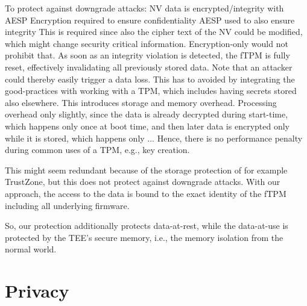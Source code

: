 To protect against downgrade attacks:
NV data is encrypted/integrity with AESP
Encryption required to ensure confidentiality
AESP used to also ensure integrity
This is required since also the cipher text of the NV could be modified, which might change security critical information.
Encryption-only would not prohibit that.
As soon as an integrity violation is detected, the \ac{fTPM} is fully reset, effectively invalidating all previously stored data.
Note that an attacker could thereby easily trigger a data loss.
This has to avoided by integrating the good-practices with working with a \ac{TPM}, which includes having secrets stored also elsewhere. %
This introduces storage and memory overhead.
Processing overhead only slightly, since the data is already decrypted during start-time, which happens only once at boot time, and then later data is encrypted only while it is stored, which happens only ... %
Hence, there is no performance penalty during common uses of a \ac{TPM}, e.g., key creation.

This might seem redundant because of the storage protection of for example TrustZone, but this does not protect against downgrade attacks. With our approach, the access to the data is bound to the exact identity of the fTPM including all underlying firmware.

So, our protection additionally protects data-at-rest, while the data-at-use is protected by the TEE's secure memory, i.e., the memory isolation from the normal world.



\section{Privacy}




